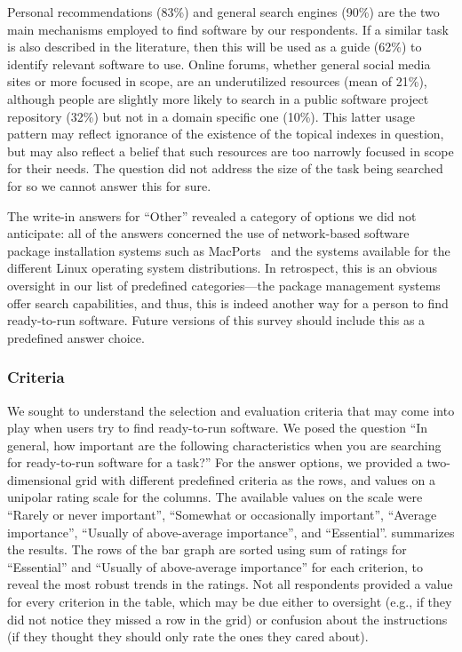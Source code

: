 \documentclass{casicswhitepaper}
\begin{document}
Personal recommendations (83\%) and general search engines (90\%) are the two main mechanisms employed to find software by our respondents. If a similar task is also described in the literature, then this will be used as a guide (62\%) to identify relevant software to use. Online forums, whether general social media sites or more focused in scope, are an underutilized resources (mean of 21\%), although people are slightly more likely to search in a public software project repository (32\%) but not in a domain specific one (10\%). This latter usage pattern may reflect ignorance of the existence of the topical indexes in question, but may also reflect a belief that such resources are too narrowly focused in scope for their needs.  The question did not address the size of the task being searched for so we cannot answer this for sure.

The write-in answers for ``Other'' revealed a category of options we did not anticipate: all of the answers concerned the use of network-based software package installation systems such as MacPorts~\cite{fuller2002macports} and the systems available for the different Linux operating system distributions.  In retrospect, this is an obvious oversight in our list of predefined categories---the package management systems offer search capabilities, and thus, this is indeed another way for a person to find ready-to-run software.  Future versions of this survey should include this as a predefined answer choice.


\subsubsection{Criteria}
\label{criteria-ready-to-use}

We sought to understand the selection and evaluation criteria that may come into play when users try to find ready-to-run software.  We posed the question ``In general, how important are the following characteristics when you are searching for ready-to-run software for a task?''  For the answer options, we provided a two-dimensional grid with different predefined criteria as the rows, and values on a unipolar rating scale for the columns.  The available values on the scale were ``Rarely or never important'', ``Somewhat or occasionally important'', ``Average importance'', ``Usually of above-average importance'', and ``Essential''.  summarizes the results.  The rows of the bar graph are sorted using sum of ratings for ``Essential'' and ``Usually of above-average importance'' for each criterion, to reveal the most robust trends in the ratings.  Not all respondents provided a value for every criterion in the table, which may be due either to oversight (e.g., if they did not notice they missed a row in the grid) or confusion about the instructions (if they thought they should only rate the ones they cared about).
\end{document}
